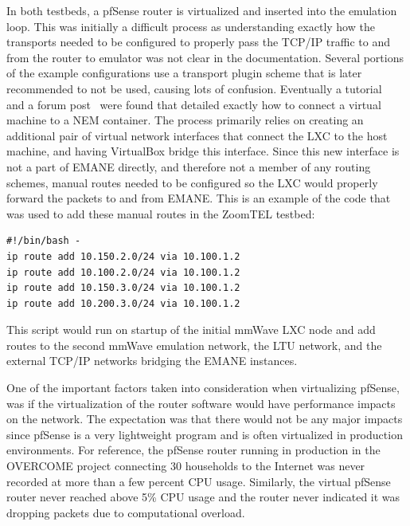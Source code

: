In both testbeds, a pfSense router is virtualized and inserted into the emulation loop.
This was initially a difficult process as understanding exactly how the transports needed to be configured to properly pass the TCP/IP traffic to and from the router to emulator was not clear in the documentation.
Several portions of the example configurations use a transport plugin scheme that is later recommended to not be used, causing lots of confusion.
Eventually a tutorial~\cite{letce2_git} and a forum post~\cite{issues_git} were found that detailed exactly how to connect a virtual machine to a NEM container.
The process primarily relies on creating an additional pair of virtual network interfaces that connect the LXC to the host machine, and having VirtualBox bridge this interface.
Since this new interface is not a part of EMANE directly, and therefore not a member of any routing schemes, manual routes needed to be configured so the LXC would properly forward the packets to and from EMANE.
This is an example of the code that was used to add these manual routes in the ZoomTEL testbed:
\begin{verbatim}
#!/bin/bash -
ip route add 10.150.2.0/24 via 10.100.1.2
ip route add 10.100.2.0/24 via 10.100.1.2
ip route add 10.150.3.0/24 via 10.100.1.2
ip route add 10.200.3.0/24 via 10.100.1.2
\end{verbatim}
This script would run on startup of the initial mmWave LXC node and add routes to the second mmWave emulation network, the LTU network, and the external TCP/IP networks bridging the EMANE instances.\par
One of the important factors taken into consideration when virtualizing pfSense, was if the virtualization of the router software would have performance impacts on the network.
The expectation was that there would not be any major impacts since pfSense is a very lightweight program and is often virtualized in production environments.
For reference, the pfSense router running in production in the OVERCOME project connecting 30 households to the Internet was never recorded at more than a few percent CPU usage.
Similarly, the virtual pfSense router never reached above 5\% CPU usage and the router never indicated it was dropping packets due to computational overload.

